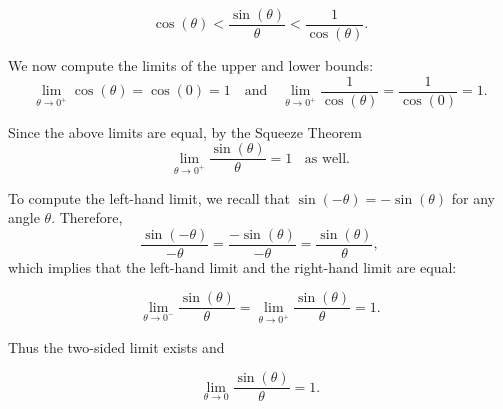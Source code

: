 \documentclass{ximera}
\begin{document}
\[
\cos(\theta)  < \frac{\sin(\theta)}{\theta} < \frac{1}{\cos(\theta)}.
\]

We now compute the limits of the upper and lower bounds:
\[
\lim_{\theta \to 0^+} \cos(\theta) = \cos(0) = 1 \quad \text{and} \quad \lim_{\theta \to 0^+} \frac{1}{\cos(\theta)} = \frac{1}{\cos(0)} = 1. 
\]

Since the above limits are equal, by the Squeeze Theorem 
\[
\lim_{\theta \to 0^+} \frac{\sin(\theta)}{\theta} = 1 \;\; \text{  as well.}
\]

To compute the left-hand limit, we recall that $\sin(-\theta) = -\sin(\theta)$ for any angle $\theta$.
Therefore,
\[
\frac{\sin(-\theta)}{-\theta} = \frac{-\sin(\theta)}{-\theta} = \frac{\sin(\theta)}{\theta},
\]
which implies that the left-hand limit and the right-hand limit are equal:

\[
\lim_{\theta \to 0^-} \frac{\sin(\theta)}{\theta} =\lim_{\theta \to 0^+} \frac{\sin(\theta)}{\theta} = 1. 
\]

Thus the two-sided limit exists and

\[
\lim_{\theta \to 0} \frac{\sin(\theta)}{\theta} =1. 
\]
\end{document}
